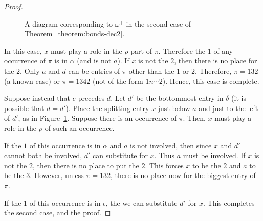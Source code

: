 \documentclass[10pt]{article}
\theoremstyle{plain}
\begin{document}
\begin{proof}
\begin{figure}
\begin{center}
		\end{center}
		\caption{A diagram corresponding to $\omega^+$ in the second case of Theorem~\ref{theorem:bonds-dec2}.}
		\label{figure:1plus-8}
	\endminipage
\end{figure}


In this case, $x$ must play a role in the $\rho$ part of $\pi$. Therefore the $1$ of any occurrence of $\pi$ is in $\alpha$ (and is not $a$). If $x$ is not the $2$, then there is no place for the $2$. Only $a$ and $d$ can be entries of $\pi$ other than the $1$ or $2$. Therefore, $\pi = 132$ (a known case) or $\pi = 1342$ (not of the form $1n\cdots 2$). Hence, this case is complete.

Suppose instead that $e$ precedes $d$. Let $d'$ be the bottommost entry in $\delta$ (it is possible that $d=d'$). Place the splitting entry $x$ just below $a$ and just to the left of $d'$, as in Figure~\ref{figure:1plus-8}. Suppose there is an occurrence of $\pi$. Then, $x$ must play a role in the $\rho$ of such an occurrence.

If the $1$ of this occurrence is in $\alpha$ and $a$ is not involved, then since $x$ and $d'$ cannot both be involved, $d'$ can substitute for $x$. Thus $a$ must be involved. If $x$ is not the $2$, then there is no place to put the $2$. This forces $x$ to be the $2$ and $a$ to be the $3$. However, unless $\pi = 132$, there is no place now for the biggest entry of $\pi$.

If the $1$ of this occurrence is in $\epsilon$, the we can substitute $d'$ for $x$. This completes the second case, and the proof.
\end{proof}
\end{document}
